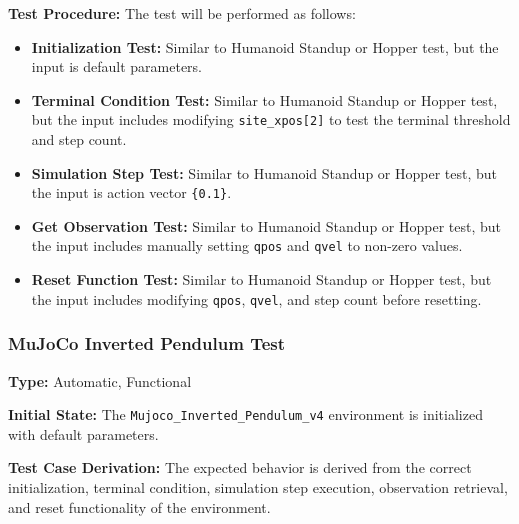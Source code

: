 \documentclass[12pt, titlepage]{article}
\begin{document}
\textbf{Test Procedure:} The test will be performed as follows:
\begin{itemize}
    \item \textbf{Initialization Test:} Similar to Humanoid Standup or Hopper test, but the input is default parameters.
    
    \item \textbf{Terminal Condition Test:} Similar to Humanoid Standup or Hopper test, but the input includes modifying \texttt{site\_xpos[2]} to test the terminal threshold and step count.
    
    \item \textbf{Simulation Step Test:} Similar to Humanoid Standup or Hopper test, but the input is action vector \texttt{\{0.1\}}.
    
    \item \textbf{Get Observation Test:} Similar to Humanoid Standup or Hopper test, but the input includes manually setting \texttt{qpos} and \texttt{qvel} to non-zero values.
    
    \item \textbf{Reset Function Test:} Similar to Humanoid Standup or Hopper test, but the input includes modifying \texttt{qpos}, \texttt{qvel}, and step count before resetting.
\end{itemize}


\subsubsection{MuJoCo Inverted Pendulum Test}

\textbf{Type:} Automatic, Functional

\textbf{Initial State:} The \texttt{Mujoco\_Inverted\_Pendulum\_v4} environment is initialized with default parameters.

\textbf{Test Case Derivation:} The expected behavior is derived from the correct initialization, terminal condition, simulation step execution, observation retrieval, and reset functionality of the environment.
\end{document}

